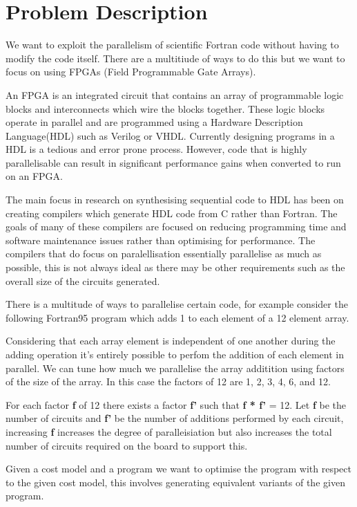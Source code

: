 \section{Problem Description}

We want to exploit the parallelism of scientific Fortran code without
having to modify the code itself. There are a multitiude of ways to do this but
we want to focus on using FPGAs (Field Programmable Gate Arrays). 

An FPGA is an integrated circuit that contains an array of programmable logic blocks and interconnects which
wire the blocks together. These logic blocks operate in parallel and are programmed using a Hardware Description Language(HDL)
such as Verilog or VHDL. Currently designing programs in a HDL is a tedious and error prone process. 
However, code that is highly parallelisable can result in significant performance gains when converted to
run on an FPGA.

The main focus in research on synthesising sequential code to HDL has been on creating compilers which generate
HDL code from C rather than Fortran. The goals of many of these compilers are focused on reducing programming 
time and software maintenance issues rather than optimising for performance. The compilers that do
focus on paralellisation essentially parallelise as much as possible, this is not always ideal
as there may be other requirements such as the overall size of the circuits generated.  

There is a multitude of ways to parallelise certain code, for example consider the following Fortran95 program
which adds 1 to each element of a 12 element array.



Considering that each array element is independent of one another during the adding operation
it's entirely possible to perfom the addition of each element in parallel. We can tune how much
we parallelise the array additition using factors of the size of the array. In this case the factors of 12 are 1, 2, 3, 4, 6, and 12.

For each factor \textbf{f} of 12 there exists a factor \textbf{f'} such that \textbf{f * f'} = 12. Let \textbf{f} be the number of 
circuits and \textbf{f'} be the number of additions performed by each circuit, increasing \textbf{f} increases the degree of 
paralleisiation but also increases the total number of circuits required on the board to support this. 

Given a cost model and a program we want to optimise the program with respect to the given cost model, this
involves generating equivalent variants of the given program.
